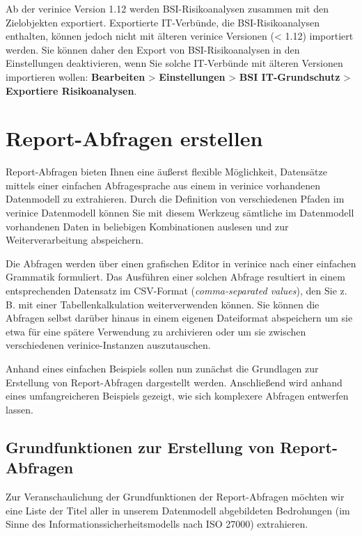 \documentclass[a4paper,10pt]{book}
\newcommand{\zB}{\mbox{z.\,B.}\xspace}
\begin{document}
Ab der verinice Version 1.12 werden BSI-Risikoanalysen zusammen mit den
Zielobjekten exportiert. Exportierte IT-Verbünde, die BSI-Risikoanalysen
enthalten, können jedoch nicht mit älteren verinice Versionen (< 1.12)
importiert werden. Sie können daher den Export von BSI-Risikoanalysen in den
Einstellungen deaktivieren, wenn Sie solche IT-Verbünde mit älteren Versionen
importieren wollen: \textbf{Bearbeiten} \textgreater \textbf{ Einstellungen}
\textgreater \textbf{ BSI IT-Grundschutz} \textgreater \textbf{ Exportiere
Risikoanalysen}.


\section{Report-Abfragen erstellen}\label{report-abfragen-erstellen}

Report-Abfragen bieten Ihnen eine äußerst flexible Möglichkeit, Datensätze
mittels einer einfachen Abfragesprache aus einem in verinice vorhandenen
Datenmodell zu extrahieren. Durch die Definition von verschiedenen Pfaden im
verinice Datenmodell können Sie mit diesem Werkzeug sämtliche im Datenmodell
vorhandenen Daten in beliebigen Kombinationen auslesen und zur
Weiterverarbeitung abspeichern.

Die Abfragen werden über einen grafischen Editor in verinice nach einer
einfachen Grammatik formuliert. Das Ausführen einer solchen Abfrage resultiert
in einem entsprechenden Datensatz im CSV-Format (\emph{comma-separated values}),
den Sie \zB mit einer Tabellenkalkulation weiterverwenden können. Sie können die
Abfragen selbst darüber hinaus in einem eigenen Dateiformat abspeichern um sie
etwa für eine spätere Verwendung zu archivieren oder um sie zwischen
verschiedenen verinice-Instanzen auszutauschen.

Anhand eines einfachen Beispiels sollen nun zunächst die Grundlagen zur
Erstellung von Report-Abfragen dargestellt werden. Anschließend wird anhand
eines umfangreicheren Beispiels gezeigt, wie sich komplexere Abfragen entwerfen
lassen.

\subsection{Grundfunktionen zur Erstellung von
Report-Abfragen}\label{grundfunktionen-zur-erstellung-von-report-abfragen}

Zur Veranschaulichung der Grundfunktionen der Report-Abfragen möchten wir eine
Liste der Titel aller in unserem Datenmodell abgebildeten Bedrohungen (im Sinne
des Informationssicherheitsmodells nach ISO 27000) extrahieren.
\end{document}
